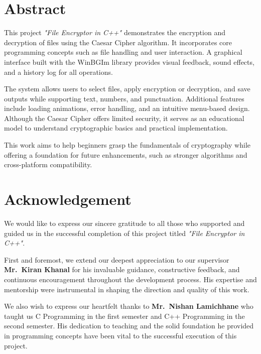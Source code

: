 \documentclass[12pt, a4paper]{report}
\begin{document}
\chapter*{Abstract}

This project \textit{"File Encryptor in C++"} demonstrates the encryption and decryption of
files using the Caesar Cipher algorithm. It incorporates core programming concepts such as
file handling and user interaction. A graphical interface built with the WinBGIm library
provides visual feedback, sound effects, and a history log for all operations.

The system allows users to select files, apply encryption or decryption, and save outputs
while supporting text, numbers, and punctuation. Additional features include loading
animations, error handling, and an intuitive menu-based design. Although the Caesar Cipher
offers limited security, it serves as an educational model to understand cryptographic basics
and practical implementation.

This work aims to help beginners grasp the fundamentals of cryptography while offering a
foundation for future enhancements, such as stronger algorithms and cross-platform
compatibility.

\newpage

\chapter*{Acknowledgement}

We would like to express our sincere gratitude to all those who supported and guided us in
the successful completion of this project titled \textit{"File Encryptor in C++"}.

First and foremost, we extend our deepest appreciation to our supervisor \textbf{Mr.~Kiran
Khanal} for his invaluable guidance, constructive feedback, and continuous encouragement
throughout the development process. His expertise and mentorship were instrumental in
shaping the direction and quality of this work.

We also wish to express our heartfelt thanks to \textbf{Mr.~Nishan Lamichhane} who taught
us C Programming in the first semester and C++ Programming in the second semester. His
dedication to teaching and the solid foundation he provided in programming concepts have
been vital to the successful execution of this project.
\end{document}
